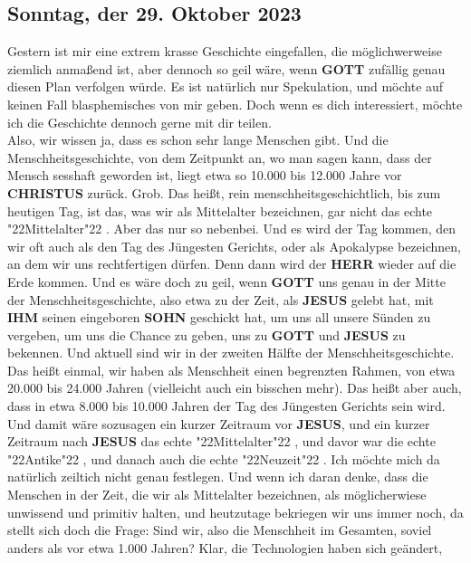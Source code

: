 \documentclass[12pt,a5paper]{article}
\newcommand{\Christus}[0]{\textbf{CHRISTUS}}
\newcommand{\Gott}[0]{\textbf{GOTT}}
\newcommand{\Herr}[0]{\textbf{HERR}}
\newcommand{\Ihm}[0]{\textbf{IHM}}
\newcommand{\Jesus}[0]{\textbf{JESUS}}
\newcommand{\Sohn}[0]{\textbf{SOHN}}
\newcommand{\q}[1]{\char"22{#1}\char"22 }
\begin{document}
	\subsection{Sonntag, der 29. Oktober 2023}
		Gestern ist mir eine extrem krasse Geschichte eingefallen,
		die m\"oglichwerweise ziemlich anma{\ss}end ist,
		aber dennoch so geil w\"are,
		wenn {\Gott} zuf\"allig genau diesen Plan verfolgen w\"urde.
		Es ist nat\"urlich nur Spekulation,
		und m\"ochte auf keinen Fall blasphemisches von mir geben.
		Doch wenn es dich interessiert,
		m\"ochte ich die Geschichte dennoch gerne mit dir teilen.
		\\
		Also,
		wir wissen ja,
		dass es schon sehr lange Menschen gibt.
		Und die Menschheitsgeschichte,
		von dem Zeitpunkt an,
		wo man sagen kann,
		dass der Mensch sesshaft geworden ist,
		liegt etwa so 10.000 bis 12.000 Jahre vor {\Christus} zur\"uck.
		Grob.
		Das hei{\ss}t,
		rein menschheitsgeschichtlich,
		bis zum heutigen Tag,
		ist das,
		was wir als Mittelalter bezeichnen,
		gar nicht das echte \q{Mittelalter}.
		Aber das nur so nebenbei.
		Und es wird der Tag kommen,
		den wir oft auch als den Tag des J\"ungesten Gerichts,
		oder als Apokalypse bezeichnen,
		an dem wir uns rechtfertigen d\"urfen.
		Denn dann wird der {\Herr} wieder auf die Erde kommen.
		Und es w\"are doch zu geil,
		wenn {\Gott} uns genau in der Mitte der Menschheitsgeschichte,
		also etwa zu der Zeit,
		als {\Jesus} gelebt hat,
		mit {\Ihm} seinen eingeboren {\Sohn} geschickt hat,
		um uns all unsere S\"unden zu vergeben,
		um uns die Chance zu geben,
		uns zu {\Gott} und {\Jesus} zu bekennen.
		Und aktuell sind wir in der zweiten H\"alfte der Menschheitsgeschichte.
		Das hei{\ss}t einmal,
		wir haben als Menschheit einen begrenzten Rahmen,
		von etwa 20.000 bis 24.000 Jahren
		(vielleicht auch ein bisschen mehr).
		Das hei{\ss}t aber auch,
		dass in etwa 8.000 bis 10.000 Jahren der Tag des J\"ungesten Gerichts sein wird.
		Und damit w\"are sozusagen ein kurzer Zeitraum vor {\Jesus},
		und ein kurzer Zeitraum nach {\Jesus} das echte \q{Mittelalter},
		und davor war die echte \q{Antike},
		und danach auch die echte \q{Neuzeit}.
		Ich m\"ochte mich da nat\"urlich zeiltich nicht genau festlegen.
		Und wenn ich daran denke,
		dass die Menschen in der Zeit,
		die wir als Mittelalter bezeichnen,
		als m\"oglicherwiese unwissend und primitiv halten,
		und heutzutage bekriegen wir uns immer noch,
		da stellt sich doch die Frage:
		Sind wir,
		also die Menschheit im Gesamten,
		soviel anders als vor etwa 1.000 Jahren?
		Klar,
		die Technologien haben sich ge\"andert,
\end{document}
